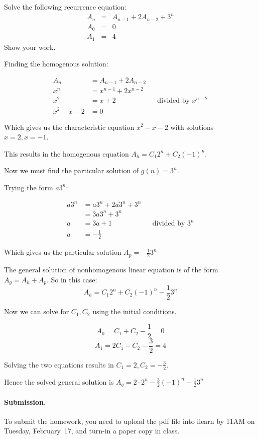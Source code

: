 
\begin{problem}
Solve the following recurrence equation:
%
\begin{eqnarray*}
        A_n &=& A_{n-1} + 2A_{n-2} + 3^n\\
        A_0 &=& 0 \\
        A_1 &=& 4
\end{eqnarray*}
%
Show your work.
\end{problem}

\begin{solution}

Finding the homogenous solution:

\begin{align*}
A_n &= A_{n-1} + 2A_{n-2} \\
x^n &= x^{n-1} + 2x^{n-2} \\
x^2 &= x + 2 && \text{divided by $x^{n-2}$} \\
x^2 - x - 2 &= 0
\end{align*}

Which gives us the characteristic equation $x^2 - x - 2$ with solutions $x=2, x=-1$.

This results in the homogenous equation $A_h = C_1 2^n + C_2 (-1)^n$.

Now we must find the particular solution of $g(n) = 3^n$.

Trying the form $a3^n$:

\begin{align*}
a3^n &= a3^n + 2a3^n +3^n \\
&= 3a3^n + 3^n \\
a &= 3a + 1 && \text{divided by $3^n$} \\ 
a &= -\frac{1}{2}
\end{align*}

Which gives us the particular solution $A_p = -\frac{1}{2}3^n$

The general solution of nonhomogenous linear equation is of the form $A_g = A_h + A_p$. So in this case:
$$A_h = C_1 2^n + C_2 (-1)^n - \frac{1}{2}3^n$$

Now we can solve for $C_1, C_2$ using the initial conditions.

$$A_0 = C_1 + C_2 - \frac{1}{2} = 0$$
$$A_1 = 2C_1 - C_2 - \frac{3}{2} = 4$$

Solving the two equations results in $C_1=2 , C_2=-\frac{3}{2}$.

Hence the solved general solution is $A_g = 2 \cdot 2^n - \frac{3}{2} (-1)^n - \frac{1}{2}3^n$

\end{solution}

\vskip 0.1in
\paragraph{Submission.}
To submit the homework, you need to upload the pdf file into ilearn by 11AM on Tuesday, February~17,
and turn-in a paper copy in class.

